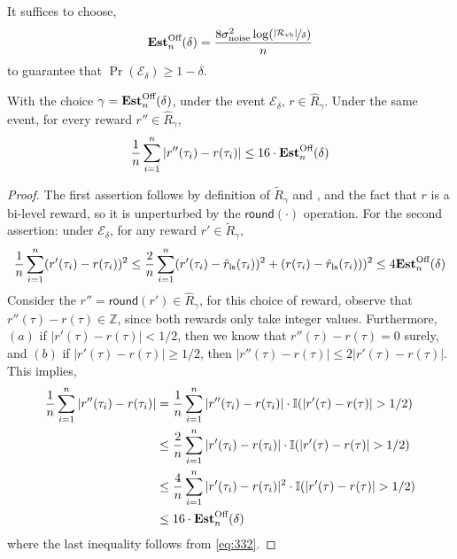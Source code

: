 \begin{lemma} \label{lemma:estoff}
It suffices to choose,
\begin{align} \label{eq:estoff-bd}
    \textbf{Est}^{\text{Off}}_n (\delta) = \frac{8 \sigma_{\text{noise}}^2 \log(\nicefrac{|{\mathcal{R}}_{\text{vb}}|}{\delta})}{n}
\end{align}
to guarantee that $\Pr (\mathcal{E}_\delta) \ge 1 - \delta$.
\end{lemma}

\begin{lemma} \label{lemma:empl1bound}
With the choice $\gamma = \textbf{Est}^{\text{Off}}_n (\delta)$, under the event $\mathcal{E}_\delta$, $r \in \hat{R}_\gamma$. Under the same event, for every reward $r'' \in \hat{R}_\gamma$,
\begin{align*}
    \frac{1}{n} \sum_{i=1}^n |r''(\tau_i) - r (\tau_i)| \le 16 \cdot \textbf{Est}^{\text{Off}}_n(\delta)
\end{align*}
\end{lemma}
\begin{proof}
The first assertion follows by definition of $\widetilde{R}_\gamma$ and , and the fact that $r$ is a bi-level reward, so it is unperturbed by the $\textsf{round} (\cdot)$ operation. For the second assertion: under $\mathcal{E}_\delta$, for any reward $r' \in \widetilde{R}_\gamma$,
\begin{align} \label{eq:332}
    \frac{1}{n} \sum_{i=1}^n (r'(\tau_i) - r(\tau_i))^2 \le \frac{2}{n} \sum_{i=1}^n (r'(\tau_i) - \hat{r}_{\text{ls}} (\tau_i))^2 + (r (\tau_i) - \hat{r}_{\text{ls}}(\tau_i)) )^2 \le 4\textbf{Est}^{\text{Off}}_n (\delta)
\end{align}
Consider the $r'' = \textsf{round} (r') \in \hat{R}_\gamma$, for this choice of reward, observe that $r'' (\tau) - r(\tau) \in \mathbb{Z}$, since both rewards only take integer values. Furthermore, $(a)$ if $|r' (\tau) - r (\tau)| < 1/2$, then we know that $r''(\tau) - r (\tau) = 0$ surely, and $(b)$ if $|r' (\tau) - r (\tau)| \ge 1/2$, then $|r''(\tau) - r (\tau)| \le 2 |r' (\tau) - r (\tau)|$. This implies,
\begin{align*}
    \frac{1}{n} \sum_{i=1}^n |r''(\tau_i) - r (\tau_i)| &= \frac{1}{n} \sum_{i=1}^n |r''(\tau_i) - r (\tau_i)| \cdot \mathbb{I} (|r' (\tau) - r (\tau)| > 1/2)\\
    &\le \frac{2}{n} \sum_{i=1}^n |r'(\tau_i) - r (\tau_i)| \cdot \mathbb{I} (|r' (\tau) - r (\tau)| > 1/2)\\
    &\le \frac{4}{n} \sum_{i=1}^n |r'(\tau_i) - r (\tau_i)|^2 \cdot \mathbb{I} (|r' (\tau) - r (\tau)| > 1/2)\\
    &\le 16 \cdot \textbf{Est}^{\text{Off}}_n(\delta)
\end{align*}
where the last inequality follows from \cref{eq:332}.
\end{proof}

